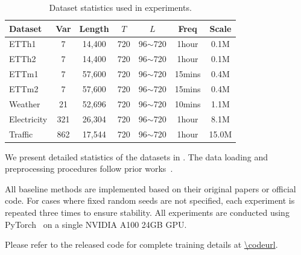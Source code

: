 \begin{table}[ht]
\centering
\begin{tabular}{lcccccc}
\hline
Dataset     & Var & Length & $T$ & $L$       & Freq   & Scale  \\
\hline
ETTh1       & 7   & 14,400 & 720 & 96$\sim$720 & 1hour   & 0.1M   \\
ETTh2       & 7   & 14,400 & 720 & 96$\sim$720 & 1hour   & 0.1M   \\
ETTm1       & 7   & 57,600 & 720 & 96$\sim$720 & 15mins  & 0.4M   \\
ETTm2       & 7   & 57,600 & 720 & 96$\sim$720 & 15mins  & 0.4M   \\
Weather     & 21  & 52,696 & 720 & 96$\sim$720 & 10mins  & 1.1M   \\
Electricity & 321 & 26,304 & 720 & 96$\sim$720 & 1hour   & 8.1M   \\
Traffic     & 862 & 17,544 & 720 & 96$\sim$720 & 1hour   & 15.0M  \\
\hline
\end{tabular}
\caption{Dataset statistics used in experiments.}
\label{tab:dataset_details}
\end{table}

We present detailed statistics of the datasets in . 
The data loading and preprocessing procedures follow prior works~\citep{nie2023patchtst, huang2025timebase}.

All baseline methods are implemented based on their original papers or official code.
For cases where fixed random seeds are not specified, each experiment is repeated three times to ensure stability. All experiments are conducted using PyTorch~\citep{paszke2019pytorch} on a single NVIDIA A100 24GB GPU.

Please refer to the released code for complete training details at \url{\codeurl}. 

